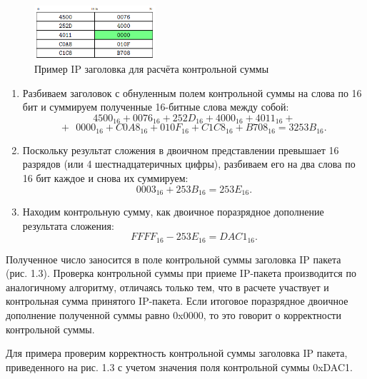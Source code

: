\begin{figure}[h]
	\centering
	\includegraphics[width=0.4\textwidth]{image/check}
	\caption{Пример IP заголовка для расчёта контрольной суммы}
	\label{IP_protocol}
\end{figure}

\begin{enumerate}
	\item Разбиваем заголовок с обнуленным полем контрольной суммы на слова по 16 бит и суммируем полученные 16-битные слова между собой:
	\begin{displaymath} 
	4500_\text{16} + 0076_\text{16} + 252D_\text{16} + 4000_\text{16} + 
	4011_\text{16} + 
	\end{displaymath}
	\begin{displaymath} 
	+ \text{ }0000_\text{16} + C0A8_\text{16} + 010F_\text{16} + C1C8_\text{16} + B708_\text{16} = 3253B_\text{16}.
	\end{displaymath}
	\item Поскольку результат сложения в двоичном представлении превышает 16 разрядов (или 4 шестнадцатеричных цифры), разбиваем его на два слова
	по 16 бит каждое и снова их суммируем:
	\begin{displaymath} 
	0003_\text{16} + 253B_\text{16} = 253E_\text{16}.
	\end{displaymath}
	\item Находим контрольную сумму, как двоичное поразрядное дополнение
	результата сложения:
	\begin{displaymath} 
	FFFF_\text{16} - 253E_\text{16} = DAC1_\text{16}.
	\end{displaymath}
\end{enumerate}

Полученное число заносится в поле контрольной суммы заголовка IP пакета (рис. 1.3).
Проверка контрольной суммы при приеме IP-пакета производится по аналогичному алгоритму, отличаясь только тем, что в расчете участвует и контрольная сумма принятого IP-пакета. Если итоговое поразрядное двоичное дополнение полученной суммы равно 0x0000, то это говорит о корректности контрольной суммы.

Для примера проверим корректность контрольной суммы заголовка IP пакета, приведенного на рис. 1.3 с учетом значения поля контрольной суммы 0xDAC1.

